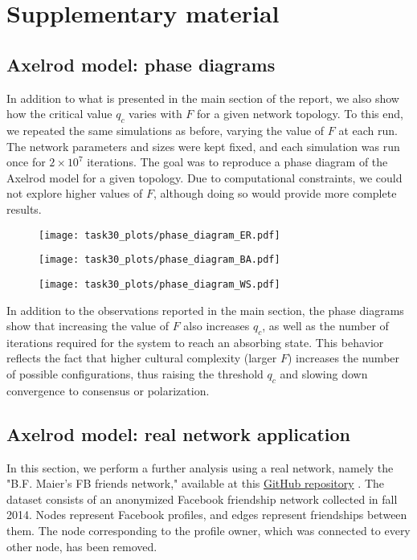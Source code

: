 \usepackage{hyperref}

\appendix
\chapter{Supplementary material}
\section{Axelrod model: phase diagrams}
In addition to what is presented in the main section of the report, we also show how the critical value $q_c$ varies with $F$ for a given network topology. To this end, we repeated the same simulations as before, varying the value of $F$ at each run. The network parameters and sizes were kept fixed, and each simulation was run once for $2 \times 10^7$ iterations. The goal was to reproduce a phase diagram of the Axelrod model for a given topology. Due to computational constraints, we could not explore higher values of $F$, although doing so would provide more complete results.

\begin{figure}[hbtp]
    \centering
    \texttt{[image: task30\_plots/phase\_diagram\_ER.pdf]}
    \end{figure}

\begin{figure}[hbtp]
    \centering
    \texttt{[image: task30\_plots/phase\_diagram\_BA.pdf]}
\end{figure}

\begin{figure}[hbtp]
    \centering
    \texttt{[image: task30\_plots/phase\_diagram\_WS.pdf]}
\end{figure}

In addition to the observations reported in the main section, the phase diagrams show that increasing the value of $F$ also increases $q_c$, as well as the number of iterations required for the system to reach an absorbing state.
This behavior reflects the fact that higher cultural complexity (larger $F$) increases the number of possible configurations, thus raising the threshold $q_c$ and slowing down convergence to consensus or polarization.

\section{Axelrod model: real network application}
In this section, we perform a further analysis using a real network, namely the "B.F. Maier's FB friends network," available at this \href{https://github.com/benmaier/BFMaierFBnetwork/blob/master}{GitHub repository} \cite{Maier2017}. The dataset consists of an anonymized Facebook friendship network collected in fall 2014. Nodes represent Facebook profiles, and edges represent friendships between them. The node corresponding to the profile owner, which was connected to every other node, has been removed.

